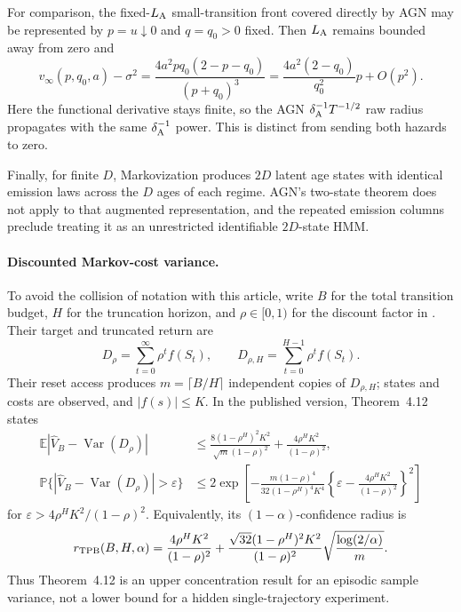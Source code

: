 For comparison, the fixed-\(L_{\rm A}\) small-transition front covered
directly by AGN may be represented by \(p=u\downarrow0\) and
\(q=q_0>0\) fixed.  Then \(L_{\rm A}\) remains bounded away from zero and
\[
 v_\infty(p,q_0,a)-\sigma^2
 =\frac{4a^2p q_0(2-p-q_0)}{(p+q_0)^3}
 =\frac{4a^2(2-q_0)}{q_0^2}p+O(p^2).
\]
Here the functional derivative stays finite, so the AGN
\(\delta_{\rm A}^{-1}T^{-1/2}\) raw radius propagates with the same
\(\delta_{\rm A}^{-1}\) power.  This is distinct from sending both hazards
to zero.

Finally, for finite \(D\), Markovization produces \(2D\) latent age states
with identical emission laws across the \(D\) ages of each regime.  AGN's
two-state theorem does not apply to that augmented representation, and the
repeated emission columns preclude treating it as an unrestricted identifiable
\(2D\)-state HMM.

\paragraph{Discounted Markov-cost variance.}
To avoid the collision of notation with this article, write \(B\) for the
total transition budget, \(H\) for the truncation horizon, and
\(\rho\in[0,1)\) for the discount factor in
\cite{ThoppePrashanthBhat2024}.  Their target and truncated return are
\[
 D_\rho=\sum_{t=0}^\infty\rho^tf(S_t),\qquad
 D_{\rho,H}=\sum_{t=0}^{H-1}\rho^tf(S_t).
\]
Their reset access produces
\(m=\lceil B/H\rceil\) independent copies of \(D_{\rho,H}\); states and
costs are observed, and \(|f(s)|\leq K\).  In the published version,
Theorem~4.12 states
\begin{align}
 \mathbb E|\widehat V_B-\operatorname{Var}(D_\rho)|
 &\leq
 \frac{8(1-\rho^H)^2K^2}{\sqrt m(1-\rho)^2}
 +\frac{4\rho^HK^2}{(1-\rho)^2},
 \label{eq:tpb-expectation}\\
 \mathbb P\{|\widehat V_B-\operatorname{Var}(D_\rho)|>\varepsilon\}
 &\leq
 2\exp\left[
 -\frac{m(1-\rho)^4}{32(1-\rho^H)^4K^4}
 \left\{\varepsilon-
 \frac{4\rho^HK^2}{(1-\rho)^2}\right\}^2
 \right]
 \label{eq:tpb-tail}
\end{align}
for
\(\varepsilon>4\rho^HK^2/(1-\rho)^2\).  Equivalently, its
\((1-\alpha)\)-confidence radius is
\begin{equation}
 r_{\rm TPB}(B,H,\alpha)
 =\frac{4\rho^HK^2}{(1-\rho)^2}
 +\frac{\sqrt{32}(1-\rho^H)^2K^2}{(1-\rho)^2}
 \sqrt{\frac{\log(2/\alpha)}m}.
 \label{eq:tpb-radius}
\end{equation}
Thus Theorem~4.12 is an upper concentration result for an episodic sample
variance, not a lower bound for a hidden single-trajectory experiment.

